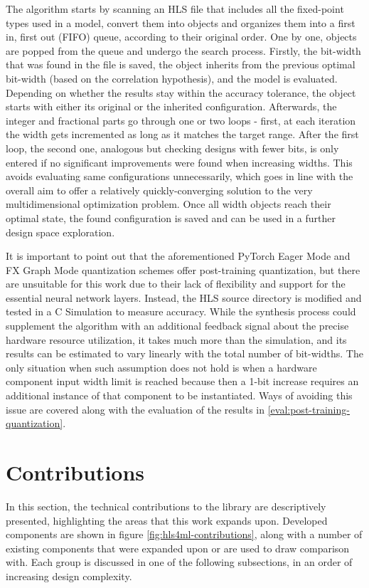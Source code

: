 The algorithm starts by scanning an HLS file that includes all the fixed-point types used in a model, convert them into objects and organizes them into a first in, first out (FIFO) queue, according to their original order. One by one, objects are popped from the queue and undergo the search process. Firstly, the bit-width that was found in the file is saved, the object inherits from the previous optimal bit-width (based on the correlation hypothesis), and the model is evaluated. Depending on whether the results stay within the accuracy tolerance, the object starts with either its original or the inherited configuration. Afterwards, the integer and fractional parts go through one or two loops - first, at each iteration the width gets incremented as long as it matches the target range. After the first loop, the second one, analogous but checking designs with fewer bits, is only entered if no significant improvements were found when increasing widths. This avoids evaluating same configurations unnecessarily, which goes in line with the overall aim to offer a relatively quickly-converging solution to the very multidimensional optimization problem. Once all width objects reach their optimal state, the found configuration is saved and can be used in a further design space exploration.

It is important to point out that the aforementioned PyTorch Eager Mode and FX Graph Mode quantization schemes offer post-training quantization, but there are unsuitable for this work due to their lack of flexibility and support for the essential neural network layers. Instead, the HLS source directory is modified and tested in a C Simulation to measure accuracy. While the synthesis process could supplement the algorithm with an additional feedback signal about the precise hardware resource utilization, it takes much more than the simulation, and its results can be estimated to vary linearly with the total number of bit-widths. The only situation when such assumption does not hold is when a hardware component input width limit is reached because then a 1-bit increase requires an additional instance of that component to be instantiated. Ways of avoiding this issue are covered along with the evaluation of the results in \cref{eval:post-training-quantization}.

\section{\hlsml Contributions}
In this section, the technical contributions to the \hlsml library are descriptively presented, highlighting the areas that this work expands upon. Developed components are shown in figure \ref{fig:hls4ml-contributions}, along with a number of existing components that were expanded upon or are used to draw comparison with. Each group is discussed in one of the following subsections, in an order of increasing design complexity.

